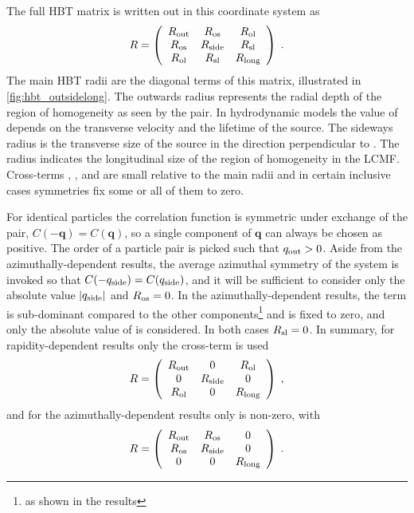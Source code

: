 The full HBT matrix is written out in this coordinate system as
\begin{equation}
  \label{eq:r_matrix_full}
  R = \left( \begin{array}{ccc}
  R_{\mathrm{out}} & R_{\mathrm{os}} & R_{\mathrm{ol}} \\
  R_{\mathrm{os}} & R_{\mathrm{side}} & R_{\mathrm{sl}} \\
  R_{\mathrm{ol}} & R_{\mathrm{sl}} & R_{\mathrm{long}}
  \end{array} \right) \; .
\end{equation}
The main HBT radii are the diagonal terms of this matrix, illustrated in \cref{fig:hbt_outsidelong}.
The outwards radius \Rout represents the radial depth of the region of homogeneity as seen by the pair.
In hydrodynamic models the value of \Rout depends on the transverse velocity and the lifetime of the source.
The sideways radius \Rside is the transverse size of the source in the direction perpendicular to \kt.
The radius \Rlong indicates the longitudinal size of the region of homogeneity in the \ac{LCMF}.
Cross-terms \Ros, \Rol, and \Rsl are small relative to the main radii and in certain inclusive cases symmetries fix some or all of them to zero.

For identical particles the correlation function is symmetric under exchange of the pair, \(C(-\mathbf{q}) = C(\mathbf{q})\), so a single component of $\mathbf{q}$ can always be chosen as positive.
The order of a particle pair is picked such that $q_{\mathrm{out}} > 0$.
Aside from the azimuthally-dependent results, the average azimuthal symmetry of the \pPb system is invoked so that $C(-q_{\mathrm{side}}) = C(q_{\mathrm{side}})$, and it will be sufficient to consider only the absolute value $|q_{\mathrm{side}}|$ and $R_{\mathrm{os}} = 0$.
In the azimuthally-dependent results, the \Rol term is sub-dominant compared to the other components\footnote{as shown in the results} and is fixed to zero, and only the absolute value of \qlong is considered.
In both cases $R_{\mathrm{sl}} = 0$.
In summary, for rapidity-dependent results only the \Rol cross-term is used
\[
R = \left( \begin{array}{ccc}
  R_{\mathrm{out}} & 0 & R_{\mathrm{ol}} \\
  0 & R_{\mathrm{side}} & 0 \\
  R_{\mathrm{ol}} & 0 & R_{\mathrm{long}}
\end{array} \right) \;,
\]
and for the azimuthally-dependent results only \Ros is non-zero, with
\[
R = \left( \begin{array}{ccc}
  R_{\mathrm{out}} & R_{\mathrm{os}} & 0 \\
  R_{\mathrm{os}} & R_{\mathrm{side}} & 0 \\
  0 & 0 & R_{\mathrm{long}}
\end{array} \right) \; .
\]

